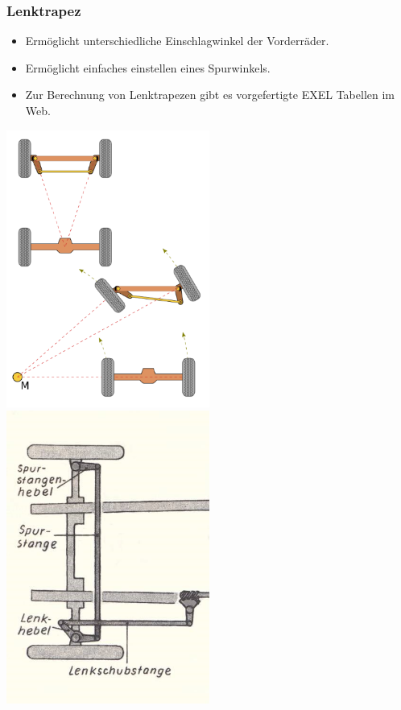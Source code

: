 \subsubsection{Lenktrapez}
\begin{itemize}
\item Ermöglicht unterschiedliche Einschlagwinkel der Vorderräder.\\
\item Ermöglicht einfaches einstellen eines Spurwinkels.\\
\item Zur Berechnung von Lenktrapezen gibt es vorgefertigte EXEL Tabellen im Web.\\
\end{itemize}
\includegraphics[width=0.5\textwidth]{Images/Lenktrapez.png}
\includegraphics[width=0.5\textwidth]{Images/Lenktrapez2.jpg}
